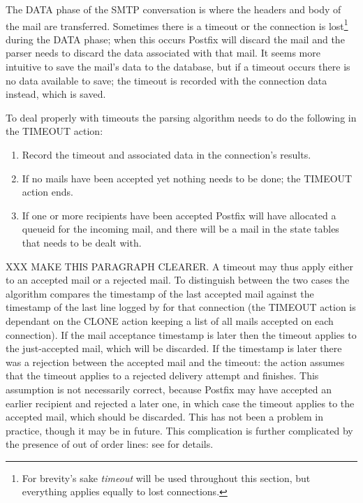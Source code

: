 The DATA phase of the \gls{SMTP} conversation is where the headers and body
of the mail are transferred.  Sometimes there is a timeout or the
connection is lost\footnote{For brevity's sake \textit{timeout\/} will be
used throughout this section, but everything applies equally to lost
connections.} during the DATA phase; when this occurs Postfix will discard
the mail and the parser needs to discard the data associated with that
mail.  It seems more intuitive to save the mail's data to the database, but
if a timeout occurs there is no data available to save; the timeout is
recorded with the connection data instead, which is saved.

To deal properly with timeouts the parsing algorithm needs to do the
following in the TIMEOUT action:

\begin{enumerate}

    \item Record the timeout and associated data in the connection's
        results.

    \item If no mails have been accepted yet nothing needs to be done; the
        TIMEOUT action ends.  

    \item If one or more recipients have been accepted Postfix will have
        allocated a queueid for the incoming mail, and there will be a mail
        in the state tables that needs to be dealt with.

\end{enumerate}

XXX MAKE THIS PARAGRAPH CLEARER\@.  A timeout may thus apply either to an
accepted mail or a rejected mail.  To distinguish between the two cases the
algorithm compares the timestamp of the last accepted mail against the
timestamp of the last line logged by  for that connection
(the TIMEOUT action is dependant on the CLONE action keeping a list of all
mails accepted on each connection).  If the mail acceptance timestamp is
later then the timeout applies to the just-accepted mail, which will be
discarded.  If the  timestamp is later there was a rejection
between the accepted mail and the timeout: the action assumes that the
timeout applies to a rejected delivery attempt and finishes.  This
assumption is not necessarily correct, because Postfix may have accepted an
earlier recipient and rejected a later one, in which case the timeout
applies to the accepted mail, which should be discarded.  This has not been
a problem in practice, though it may be in future.  This complication is
further complicated by the presence of out of order  lines:
see  for details.

